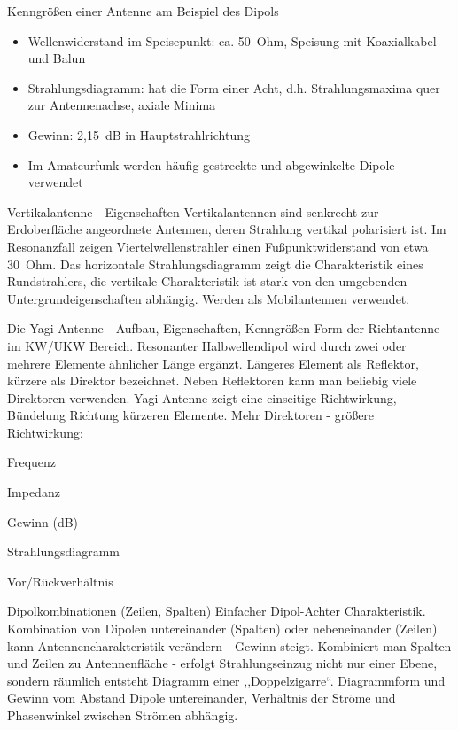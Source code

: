 \documentclass[avery5371,grid,frame,a4paper]{flashcards}
\newcommand{\card}[3]{
  \begin{flashcard}[{\chap} -- #1]{#2}#3\end{flashcard}
}
\begin{document}
\card{32}{Kenngrößen einer Antenne am Beispiel des Dipols}{
  \begin{itemize}
    \item Wellenwiderstand im Speisepunkt: ca. 50~Ohm, Speisung mit Koaxialkabel und Balun
    \item Strahlungsdiagramm: hat die Form einer Acht, d.h. Strahlungsmaxima quer zur Antennenachse, axiale Minima
    \item Gewinn: 2,\SI{15}{\dB} in Hauptstrahlrichtung
    \item Im Amateurfunk werden häufig gestreckte und abgewinkelte Dipole verwendet
  \end{itemize}
}
\card{33}{Vertikalantenne - Eigenschaften}{
  Vertikalantennen sind senkrecht zur Erdoberfläche angeordnete Antennen, deren Strahlung vertikal polarisiert ist. Im Resonanzfall zeigen Viertelwellenstrahler einen Fußpunktwiderstand von etwa 30~Ohm. Das horizontale Strahlungsdiagramm zeigt die Charakteristik eines Rundstrahlers, die vertikale Charakteristik ist stark von den umgebenden Untergrundeigenschaften abhängig. Werden als Mobilantennen verwendet.}
\card{34}{Die Yagi-Antenne - Aufbau, Eigenschaften, Kenngrößen}{
  Form der Richtantenne im KW/UKW Bereich.
  Resonanter Halbwellendipol wird durch zwei oder mehrere Elemente ähnlicher Länge ergänzt. Längeres Element als Reflektor, kürzere als Direktor bezeichnet. Neben Reflektoren kann man beliebig viele Direktoren verwenden. Yagi-Antenne zeigt eine einseitige Richtwirkung, Bündelung Richtung kürzeren Elemente. Mehr Direktoren - größere Richtwirkung:

  \begin{itemize*}
    \item Frequenz 
    \item Impedanz 
    \item Gewinn (dB) 
    \item Strahlungsdiagramm 
    \item Vor/Rückverhältnis
  \end{itemize*}
}
\card{35}{Dipolkombinationen (Zeilen, Spalten)}{
  Einfacher Dipol-Achter Charakteristik. Kombination von Dipolen untereinander (Spalten) oder nebeneinander (Zeilen) kann Antennencharakteristik verändern - Gewinn steigt. Kombiniert man Spalten und Zeilen zu Antennenfläche - erfolgt Strahlungseinzug nicht nur einer Ebene, sondern räumlich entsteht Diagramm einer ,,Doppelzigarre``. Diagrammform und Gewinn vom Abstand Dipole untereinander, Verhältnis der Ströme und Phasenwinkel zwischen Strömen abhängig.
}
\end{document}
